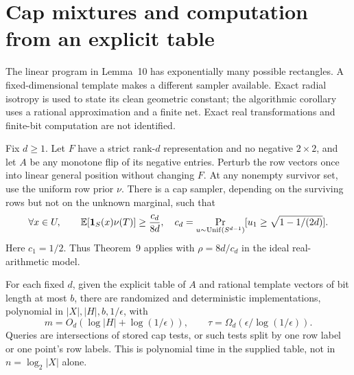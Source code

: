 \section{Cap mixtures and computation from an explicit table}\label{sec:caps}
The linear program in Lemma~10 has exponentially many possible rectangles. A fixed-dimensional template makes a different sampler available. Exact radial isotropy is used to state its clean geometric constant; the algorithmic corollary uses a rational approximation and a finite net. Exact real transformations and finite-bit computation are not identified.

\setcounter{theorem}{15}
\begin{theorem}\label{thm:caps}
Fix $d\ge1$. Let $F$ have a strict rank-$d$ representation and no negative $2\times2$, and let $A$ be any monotone flip of its negative entries. Perturb the row vectors once into linear general position without changing $F$. At any nonempty survivor set, use the uniform row prior $\nu$. There is a cap sampler, depending on the surviving rows but not on the unknown marginal, such that
\begin{equation}\label{eq:capcoverage}
 \forall x\in U,\qquad \mathbb E[\mathbf 1_S(x)\nu(T)]\ge\frac{c_d}{8d},
 \quad c_d=\Pr_{u\sim\mathrm{Unif}(S^{d-1})}
 [u_1\ge\sqrt{1-1/(2d)}].
\end{equation}
Here $c_1=1/2$. Thus Theorem~9 applies with $\rho=8d/c_d$ in the ideal real-arithmetic model.

For each fixed $d$, given the explicit table of $A$ and rational template vectors of bit length at most $b$, there are randomized and deterministic implementations, polynomial in $|X|,|H|,b,1/\epsilon$, with
\[
 m=O_d(\log|H|+\log(1/\epsilon)),\qquad
 \tau=\Omega_d(\epsilon/\log(1/\epsilon)).
\]
Queries are intersections of stored cap tests, or such tests split by one row label or one point's row labels. This is polynomial time in the supplied table, not in $n=\log_2|X|$ alone.
\end{theorem}
